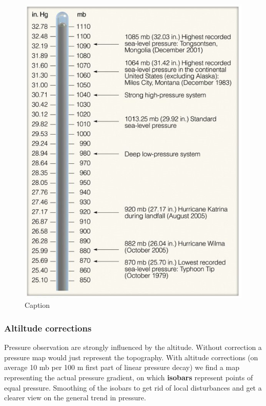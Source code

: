 \documentclass[12pt,oneside]{book}
\begin{document}
\begin{figure}

{\centering \includegraphics[width=0.8\linewidth]{figures/Figure43} 

}

\caption{Caption}\label{fig:Pmes}
\end{figure}

\subsubsection{Altiltude corrections}\label{altiltude-corrections}

Pressure observation are strongly influenced by the altitude. Without
correction a pressure map would just represent the topography. With
altitude corrections (on average 10 mb per 100 m first part of linear
pressure decay) we find a map representing the actual pressure gradient,
on which \textbf{isobars} represent points of equal pressure. Smoothing
of the isobars to get rid of local disturbances and get a clearer view
on the general trend in pressure.
\end{document}
